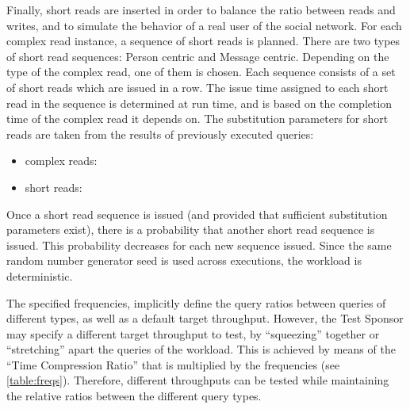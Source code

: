 Finally, short reads are inserted in order to balance the ratio between reads
and writes, and to simulate the behavior of a real user of the social network.
For each complex read instance, a sequence of short reads is planned. There are two
types of short read sequences: Person centric and Message centric. Depending on
the type of the complex read, one of them is chosen. Each sequence consists of
a set of short reads which are issued in a row. The issue time assigned to each
short read in the sequence is determined at run time, and is based on the
completion time of the complex read it depends on. 
The substitution parameters for short reads are taken from the results of previously
executed queries:
\begin{itemize}
\item complex reads:
\item short reads:
\end{itemize}

Once a short read sequence is issued (and provided that sufficient substitution parameters 
exist), there is a probability that another short read  sequence is issued. 
This probability decreases for each new sequence issued. 
Since the same random number generator seed is used across
executions, the workload is deterministic.


The specified frequencies, implicitly define the query ratios between queries
of different types, as well as a default target throughput. However, the Test
Sponsor may specify a different target throughput to test,  by ``squeezing''
together or ``stretching'' apart the queries of the workload. This is
achieved by means of the ``Time Compression Ratio'' that is multiplied by the
frequencies (see \autoref{table:freqs}).  Therefore, different
throughputs can be tested while maintaining the relative ratios between the
different query types.
